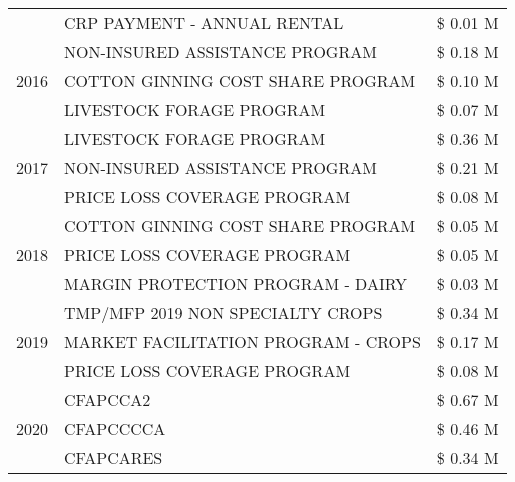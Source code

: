 \begin{tabular}{llr}
 & CRP PAYMENT - ANNUAL RENTAL & \$ 0.01 M \\
\cline{1-3}
\multirow[t]{3}{*}{2016} & NON-INSURED ASSISTANCE PROGRAM & \$ 0.18 M \\
 & COTTON GINNING COST SHARE PROGRAM & \$ 0.10 M \\
 & LIVESTOCK FORAGE PROGRAM & \$ 0.07 M \\
\cline{1-3}
\multirow[t]{3}{*}{2017} & LIVESTOCK FORAGE PROGRAM & \$ 0.36 M \\
 & NON-INSURED ASSISTANCE PROGRAM & \$ 0.21 M \\
 & PRICE LOSS COVERAGE PROGRAM & \$ 0.08 M \\
\cline{1-3}
\multirow[t]{3}{*}{2018} & COTTON GINNING COST SHARE PROGRAM & \$ 0.05 M \\
 & PRICE LOSS COVERAGE PROGRAM & \$ 0.05 M \\
 & MARGIN PROTECTION PROGRAM - DAIRY & \$ 0.03 M \\
\cline{1-3}
\multirow[t]{3}{*}{2019} & TMP/MFP 2019 NON SPECIALTY CROPS & \$ 0.34 M \\
 & MARKET FACILITATION PROGRAM - CROPS & \$ 0.17 M \\
 & PRICE LOSS COVERAGE PROGRAM & \$ 0.08 M \\
\cline{1-3}
\multirow[t]{3}{*}{2020} & CFAPCCA2 & \$ 0.67 M \\
 & CFAPCCCCA & \$ 0.46 M \\
 & CFAPCARES & \$ 0.34 M \\
\cline{1-3}
\bottomrule
\end{tabular}

